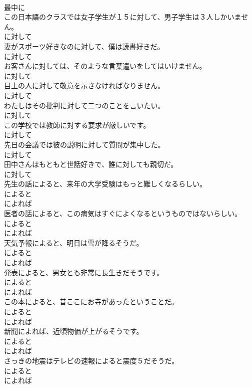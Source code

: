 \documentclass[8pt]{extreport}
\begin{document}
\begin{CJK}{UTF8}{min}
\\	最中に	
\\	この日本語のクラスでは女子学生が１５に対して、男子学生は３人しかいません。	
\\	に対して	
\\	妻がスポーツ好きなのに対して、僕は読書好きだ。	
\\	に対して	
\\	お客さんに対しては、そのような言葉遣いをしてはいけません。	
\\	に対して	
\\	目上の人に対して敬意を示さなければなりません。	
\\	に対して	
\\	わたしはその批判に対して二つのことを言いたい。	
\\	に対して	
\\	この学校では教師に対する要求が厳しいです。	
\\	に対して	
\\	先日の会議では彼の説明に対して質問が集中した。	
\\	に対して	
\\	田中さんはもともと世話好きで、誰に対しても親切だ。	
\\	に対して	
\\	先生の話によると、来年の大学受験はもっと難しくなるらしい。	
\\	によると 
\\	によれば	
\\	医者の話によると、この病気はすぐによくなるというものではないらしい。	
\\	によると 
\\	によれば	
\\	天気予報によると、明日は雪が降るそうだ。	
\\	によると 
\\	によれば	
\\	発表によると、男女とも非常に長生きだそうです。	
\\	によると 
\\	によれば	
\\	この本によると、昔ここにお寺があったということだ。	
\\	によると 
\\	によれば	
\\	新聞によれば、近頃物価が上がるそうです。	
\\	によると 
\\	によれば	
\\	さっきの地震はテレビの速報によると震度５だそうだ。	
\\	によると 
\\	によれば	

\end{CJK}
\end{document}
